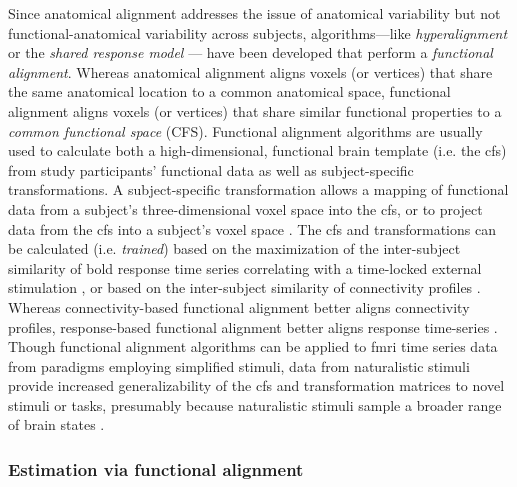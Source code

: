 %
Since anatomical alignment addresses the issue of anatomical variability but not
functional-anatomical variability across subjects, algorithms---like
\textit{hyperalignment} \citep{haxby2011common, guntupalli2016model} or the
\textit{shared response model} \citep{chen2015reduced, zhang2016searchlight}---
have been developed that perform a \textit{functional alignment}.
%
Whereas anatomical alignment aligns voxels (or vertices) that share the same
anatomical location to a common anatomical space, functional alignment aligns
voxels (or vertices) that share similar functional properties to a
\textit{common functional space} (CFS).
%
Functional alignment algorithms are usually used to calculate both a
high-dimensional, functional brain template (i.e. the \ac{cfs}) from study
participants' functional data as well as subject-specific transformations.
%
A subject-specific transformation allows a mapping of functional data from a
subject's three-dimensional voxel space into the \ac{cfs}, or to project data
from the \ac{cfs} into a subject's voxel space \citep{haxby2020hyperalignment,
kumar2020brainiak}.
%
The \ac{cfs} and transformations can be calculated (i.e. \textit{trained}) based
on the maximization of the inter-subject similarity of \ac{bold} response time
series correlating with a time-locked external stimulation
\citep{haxby2011common, chen2015reduced, sabuncu2010function}, or based on the
inter-subject similarity of connectivity profiles \citep{feilong2018reliable,
guntupalli2018computational, nastase2019leveraging}.
%
Whereas connectivity-based functional alignment better aligns connectivity
profiles, response-based functional alignment better aligns response
time-series \citep{guntupalli2018computational}.
%
Though functional alignment algorithms can be applied to \ac{fmri} time series
data from paradigms employing simplified stimuli, data from naturalistic stimuli
provide
%
increased generalizability of the \ac{cfs}
%
and transformation matrices
%
to novel stimuli or tasks, presumably because naturalistic stimuli sample a
broader range of brain states \citep{haxby2011common, guntupalli2016model}.


\subsubsection{Estimation via functional alignment}



